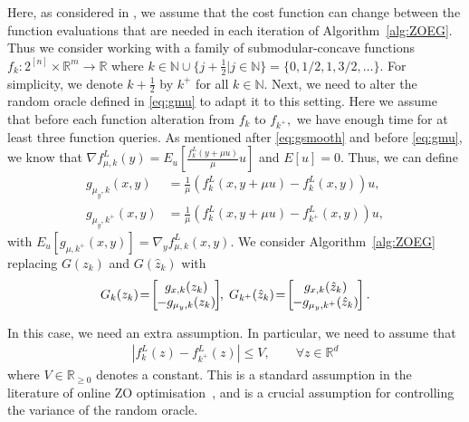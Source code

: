 \documentclass{article}
\theoremstyle{plain}
\theoremstyle{definition}
\theoremstyle{remark}
\newcommand{\R}{\mathbb{R}}
\begin{document}
Here, as considered in \cite{shames2019online,farzin2025minimisationsubmodular}, we assume that the cost function can change between the function evaluations that are needed in each iteration of Algorithm~\ref{alg:ZOEG}. Thus we consider working with a family of submodular-concave functions $f_k: 2^{[n]}\times\R^m \rightarrow \mathbb{R}$ where $k\in\mathbb{N}\cup\{j+\frac{1}{2}|j\in\mathbb{N}\} = \{0,1/2,1,3/2,\dots\}.$  For simplicity, we denote $k+\frac{1}{2}$ by $k^+$ for all $k\in\mathbb{N}.$ 
Next, we need to alter the random oracle defined in \eqref{eq:gmu} to adapt it to this setting. Here we assume that before each function alteration from $f_k$ to $f_{k^+},$ we have enough time for at least three function queries.  As mentioned after \eqref{eq:gsmooth} and before \eqref{eq:gmu}, 
we know that $\nabla f^L_{\mu,k}(y) = E_u[\frac{f^L_{k}(y+\mu u)}{\mu}u]$ and $E[u]=0.$ Thus, we can define 
\begin{align}\label{eq:gon11}
    g_{\mu_y,k}(x,y) &= \tfrac{1}{\mu} (f^L_{k}(x,y+\mu u)-f^L_{k}(x,y)) u, \\
    g_{\mu_y,k^+}(x,y) &= \tfrac{1}{\mu} (f^L_{k}(x,y+\mu u)-f^L_{k^+}(x,y)) u, \label{eq:gon}
\end{align}
with
$E_u[g_{\mu,k^+}(x,y)]=\nabla_y f^L_{\mu,k}(x,y).$ We consider Algorithm~\ref{alg:ZOEG} replacing $G(z_k)$ and $G(\hat{z}_k)$ with 
\begin{align}
    G_k(z_k)\!=\!\left[ \hspace{-0.2cm} \begin{array}{c}
         g_{x,k}(z_k)\\ 
         -g_{\mu_y,k}(z_k)
    \end{array} \hspace{-0.2cm} \right]\hspace{-0.1cm},\; G_{k^+}(\hat{z}_k)\!=\!\left[ \hspace{-0.2cm} \begin{array}{c}
         g_{x,k}(\hat{z}_k)\\ 
         -g_{\mu_y,k^+}(\hat{z}_k)
    \end{array} \hspace{-0.2cm} \right].
\end{align}

In this case, we need an extra assumption. In particular, we need to assume that 
\begin{align}\label{ass:V}
    |f^L_k(z)-f^L_{k^+}(z)|\leq V, \qquad \forall z\in\R^d
\end{align}
    where $V\in \R_{\geq 0}$ denotes a constant. This is a standard assumption in the literature of online ZO optimisation~\cite{shames2019online}, and is a crucial assumption for controlling the variance of the random oracle.
\end{document}
